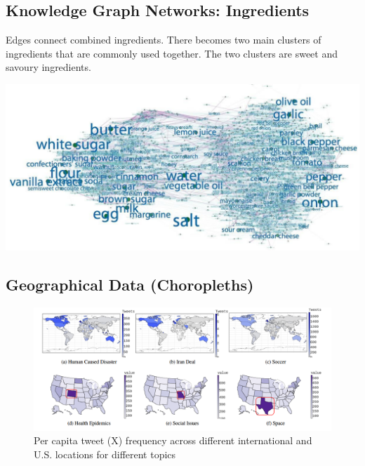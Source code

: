 \documentclass[11pt]{article}
\theoremstyle{definition}
\begin{document}
\subsection{Knowledge Graph Networks: Ingredients}
  Edges connect combined ingredients. 
  There becomes two main clusters of ingredients that are commonly used together.
  The two clusters are sweet and savoury ingredients.

  \includegraphics[width=\textwidth/2]{15.png}

\subsection{Geographical Data (Choropleths)}

  \begin{figure}[h]
    \centering
    \includegraphics[width=\textwidth]{11.png}
    \caption{Per capita tweet (X) frequency across different international and U.S. locations for different topics}
    \label{fig:3}
  \end{figure}
\end{document}
